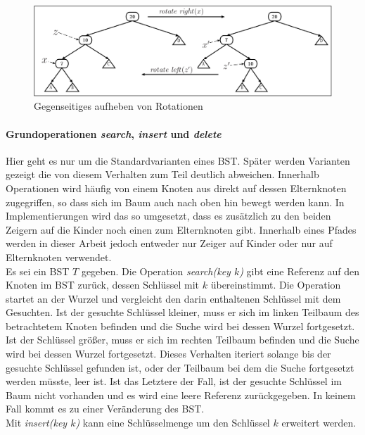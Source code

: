 \documentclass[a4paper,12pt]{article}
\begin{document}
\begin{figure}[H]
	\centering
	\includegraphics[width= 1\textwidth]{"Medien/Einleitung/LinksRechtsRotation"}
	\caption{Gegenseitiges aufheben von Rotationen}
	\label{fig:LinksRechtsRotation}
\end{figure}

\paragraph{Grundoperationen \textit{search}, \textit{insert} und \textit{delete}} \label{BST Operationen}
Hier geht es nur um die Standardvarianten eines BST. Später werden Varianten gezeigt die von diesem Verhalten zum Teil deutlich abweichen. Innerhalb Operationen wird häufig von einem Knoten aus direkt
auf dessen Elternknoten zugegriffen, so dass sich im Baum auch nach oben hin bewegt werden kann. In Implementierungen wird das so umgesetzt, dass es zusätzlich zu den beiden Zeigern auf die Kinder noch einen zum Elternknoten gibt. Innerhalb eines Pfades werden in dieser Arbeit jedoch entweder nur Zeiger auf Kinder oder nur auf Elternknoten verwendet.\\
 Es sei ein BST $T$ gegeben. Die Operation \textit{search(key $k$)} gibt eine Referenz auf den Knoten im BST zurück, dessen Schlüssel mit $k$ übereinstimmt. Die Operation startet an der Wurzel und vergleicht den darin enthaltenen Schlüssel mit dem Gesuchten. Ist der gesuchte Schlüssel kleiner, muss er sich im linken Teilbaum des betrachtetem Knoten befinden und die Suche wird bei dessen Wurzel fortgesetzt. Ist der Schlüssel größer, muss er sich im rechten Teilbaum befinden und die Suche wird bei dessen Wurzel fortgesetzt. Dieses Verhalten iteriert solange bis der gesuchte Schlüssel gefunden ist, oder der Teilbaum bei dem die Suche fortgesetzt werden müsste, leer ist. Ist das Letztere der Fall, ist der gesuchte Schlüssel im Baum nicht vorhanden und es wird eine leere Referenz zurückgegeben. In keinem Fall kommt es zu einer Veränderung des BST.\\
Mit \textit{insert(key $k$)}  kann eine Schlüsselmenge um den Schlüssel $k$ erweitert werden. 
\end{document}
